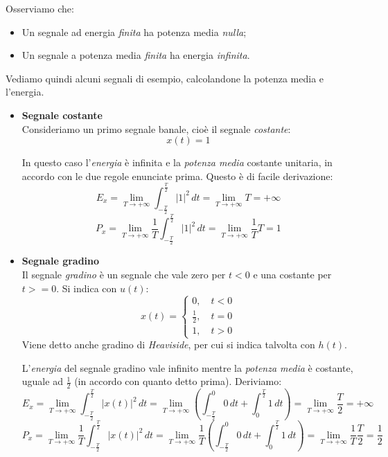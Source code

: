 \documentclass[a4paper,11pt]{article}
\begin{document}
Osserviamo che:
\begin{itemize}
	\item Un segnale ad energia \textit{finita} ha potenza media \textit{nulla};
	\item Un segnale a potenza media \textit{finita} ha energia \textit{infinita}.
\end{itemize}

\par\smallskip

Vediamo quindi alcuni segnali di esempio, calcolandone la potenza media e l'energia.

\begin{itemize}
	\item \textbf{\textsf{Segnale costante}} \\
Consideriamo un primo segnale banale, cioè il segnale \textit{costante}:
$$
x(t) = 1
$$

In questo caso l'\textit{energia} è infinita e la \textit{potenza media} costante unitaria, in accordo con le due regole enunciate prima. Questo è di facile derivazione:
$$
E_x = \lim_{T \rightarrow + \infty} \int_{-\frac{T}{2}}^{\frac{T}{2}} |1|^2 \, dt =  \lim_{T \rightarrow + \infty} T = + \infty
$$
$$
P_x = \lim_{T \rightarrow + \infty} \frac{1}{T} \int_{-\frac{T}{2}}^{\frac{T}{2}} |1|^2 \, dt =  \lim_{T \rightarrow + \infty} \frac{1}{T} T = 1 
$$

	\item \textbf{\textsf{Segnale gradino}} \\
Il segnale \textit{gradino} è un segnale che vale zero per $t < 0$ e una costante per $t >= 0$. Si indica con $u(t)$:
\[
	x(t) = 
	\begin{cases}
		0, \quad t < 0 \\
		\frac{1}{2}, \quad t = 0 \\
		1, \quad t > 0
	\end{cases}
\]
Viene detto anche gradino di \textit{Heaviside}, per cui si indica talvolta con $h(t)$.

L'\textit{energia} del segnale gradino vale infinito mentre la \textit{potenza media} è costante, uguale ad $\frac{1}{2}$ (in accordo con quanto detto prima). Deriviamo:
$$
E_x = \lim_{T \rightarrow + \infty} \int_{-\frac{T}{2}}^{\frac{T}{2}} |x(t)|^2 \, dt = \lim_{T \rightarrow + \infty} \left( \int_{-\frac{T}{2}}^0 0 \, dt + \int_0^{\frac{T}{2}} 1 \, dt \right) = \lim_{T \rightarrow + \infty} \frac{T}{2} = + \infty
$$
$$
P_x = \lim_{T \rightarrow + \infty} \frac{1}{T} \int_{-\frac{T}{2}}^{\frac{T}{2}} |x(t)|^2 \, dt = \lim_{T \rightarrow + \infty} \frac{1}{T} \left( \int_{-\frac{T}{2}}^0 0 \, dt + \int_0^{\frac{T}{2}} 1 \, dt \right) = \lim_{T \rightarrow + \infty} \frac{1}{T} \frac{T}{2} = \frac{1}{2} 
$$


\end{itemize}
\end{document}
